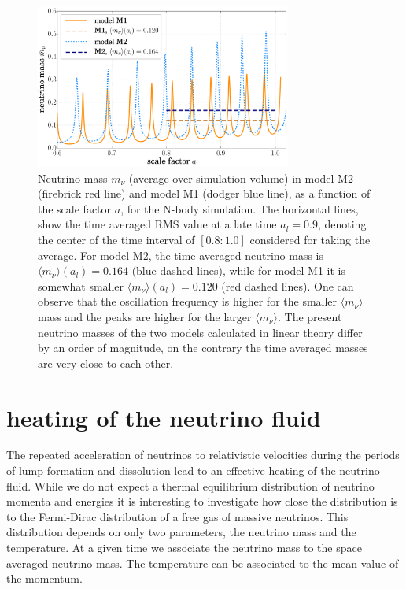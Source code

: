 \begin{figure}
\begin{centering}
\includegraphics[width=0.75\textwidth]{Chapters/gnq/figures/Background-model1model-model2-gnq_mnu-v1} 
\par\end{centering}
\caption[Neutrino mass $\overline{m}_{\nu}$
in model M2 and M1 of GNQ.]{\textbf{\label{fig:NuMass-mod2}}Neutrino mass $\overline{m}_{\nu}$
(average over simulation volume) in model M2 (firebrick red line)
and model M1 (dodger blue line), as a function of the scale factor
$a$, for the N-body simulation. The horizontal lines, show the time
averaged RMS value at a late time $a_{l}=0.9$, denoting the center
of the time interval of $[0.8:1.0]$ considered for taking the average.
For model M2, the time averaged neutrino mass is $\langle m_{\nu}\rangle(a_{l})=0.164$
(blue dashed lines), while for model M1 it is somewhat smaller $\langle m_{\nu}\rangle(a_{l})=0.120$
(red dashed lines). One can observe that the oscillation frequency
is higher for the smaller $\langle m_{\nu}\rangle$ mass and the peaks
are higher for the larger $\langle m_{\nu}\rangle$. The present neutrino
masses of the two models calculated in linear theory differ by an
order of magnitude, on the contrary the time averaged masses are very
close to each other. }
\end{figure}



\section{\label{sec:heating-of-the-neutrino}heating of the neutrino fluid}

The repeated acceleration of neutrinos to relativistic velocities
during the periods of lump formation and dissolution lead to an effective
heating of the neutrino fluid. While we do not expect a thermal equilibrium
distribution of neutrino momenta and energies it is interesting to
investigate how close the distribution is to the Fermi-Dirac distribution
of a free gas of massive neutrinos. This distribution depends on only
two parameters, the neutrino mass and the temperature. At a given
time we associate the neutrino mass to the space averaged neutrino
mass. The temperature can be associated to the mean value of the momentum.

